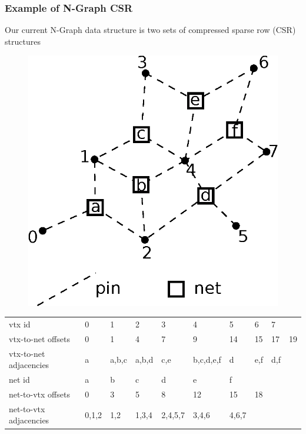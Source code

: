 \documentclass{beamer}
\begin{document}
\begin{frame}
  \frametitle{Example of N-Graph CSR}
  Our current N-Graph data structure is two sets of compressed sparse row (CSR)
  structures
  \begin{figure}
    \centering
    \includegraphics[width=.4\textwidth]{figures/hypergraph.eps}
  \end{figure}  
  {\tiny
  \begin{table}[]
    \centering
    \label{my-label}
    \begin{tabular}{llllllllll}
      vtx id                 & 0     & 1     & 2     & 3       & 4         & 5     & 6   & 7   &    \\
      vtx-to-net offsets     & 0     & 1     & 4     & 7       & 9         & 14    & 15  & 17  & 19 \\
      vtx-to-net adjacencies & a     & a,b,c & a,b,d & c,e     & b,c,d,e,f & d     & e,f & d,f &    \\
      \hline
      net id                 & a     & b     & c     & d       & e         & f     &     &     &    \\
      net-to-vtx offsets     & 0     & 3     & 5     & 8       & 12        & 15    & 18  &     &    \\
      net-to-vtx adjacencies & 0,1,2 & 1,2   & 1,3,4 & 2,4,5,7 & 3,4,6     & 4,6,7 &     &     &   
    \end{tabular}
  \end{table}
  }
\end{frame}
\end{document}
